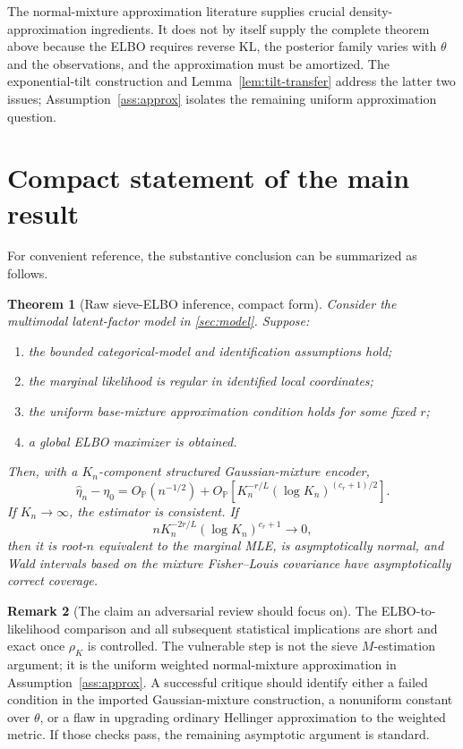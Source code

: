 \documentclass[11pt]{article}
\newtheorem{theorem}{Theorem}[section]
\theoremstyle{definition}
\newtheorem{remark}[theorem]{Remark}
\newcommand{\Pp}{\mathbb P}
\newcommand{\Op}{O_{\Pp}}
\begin{document}
The normal-mixture approximation literature supplies crucial density-approximation ingredients. It does not by itself supply the complete theorem above because the ELBO requires reverse KL, the posterior family varies with $\theta$ and the observations, and the approximation must be amortized. The exponential-tilt construction and Lemma~\ref{lem:tilt-transfer} address the latter two issues; Assumption~\ref{ass:approx} isolates the remaining uniform approximation question.

\section{Compact statement of the main result}

For convenient reference, the substantive conclusion can be summarized as follows.

\begin{theorem}[Raw sieve-ELBO inference, compact form]
\label{thm:compact}
Consider the multimodal latent-factor model in \cref{sec:model}. Suppose:
\begin{enumerate}[label=(\roman*)]
\item the bounded categorical-model and identification assumptions hold;
\item the marginal likelihood is regular in identified local coordinates;
\item the uniform base-mixture approximation condition holds for some fixed $r$;
\item a global ELBO maximizer is obtained.
\end{enumerate}
Then, with a $K_n$-component structured Gaussian-mixture encoder,
\[
\widehat\eta_n-\eta_0
=
\Op(n^{-1/2})
+
\Op\!\left[
K_n^{-r/L}(\log K_n)^{(c_r+1)/2}
\right].
\]
If $K_n\to\infty$, the estimator is consistent. If
\[
nK_n^{-2r/L}(\log K_n)^{c_r+1}\to0,
\]
then it is root-$n$ equivalent to the marginal MLE, is asymptotically normal, and Wald intervals based on the mixture Fisher--Louis covariance have asymptotically correct coverage.
\end{theorem}

\begin{remark}[The claim an adversarial review should focus on]
The ELBO-to-likelihood comparison and all subsequent statistical implications are short and exact once $\rho_K$ is controlled. The vulnerable step is not the sieve $M$-estimation argument; it is the uniform weighted normal-mixture approximation in Assumption~\ref{ass:approx}. A successful critique should identify either a failed condition in the imported Gaussian-mixture construction, a nonuniform constant over $\theta$, or a flaw in upgrading ordinary Hellinger approximation to the weighted metric. If those checks pass, the remaining asymptotic argument is standard.
\end{remark}
\end{document}
